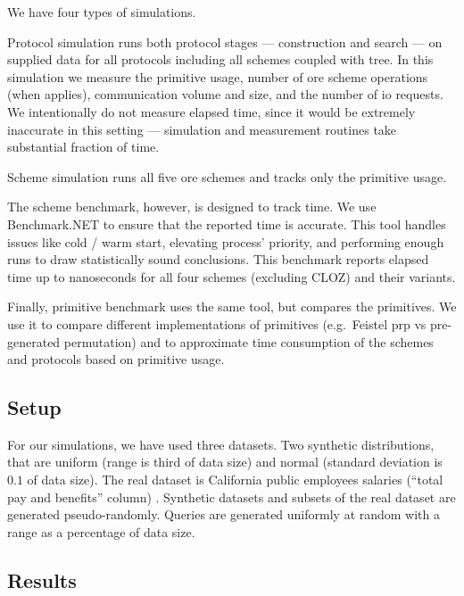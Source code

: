 			

			We have four types of simulations.

			Protocol simulation runs both protocol stages --- construction and search --- on supplied data for all protocols including all schemes coupled with {\BPlus} tree.
			In this simulation we measure the primitive usage, number of \acrshort{ore} scheme operations (when applies), communication volume and size, and the number of \acrshort{io} requests.
			We intentionally do not measure elapsed time, since it would be extremely inaccurate in this setting --- simulation and measurement routines take substantial fraction of time.

			Scheme simulation runs all five \acrshort{ore} schemes and tracks only the primitive usage.

			The scheme benchmark, however, is designed to track time.
			We use Benchmark.NET \cite{benchmark-net} to ensure that the reported time is accurate.
			This tool handles issues like cold / warm start, elevating process' priority, and performing enough runs to draw statistically sound conclusions.
			This benchmark reports elapsed time up to nanoseconds for all four schemes (excluding CLOZ) and their variants.

			Finally, primitive benchmark uses the same tool, but compares the primitives.
			We use it to compare different implementations of primitives (e.g.\ Feistel \acrshort{prp} vs pre-generated permutation) and to approximate time consumption of the schemes and protocols based on primitive usage.

	\subsection{Setup}

		For our simulations, we have used three datasets.
		Two synthetic distributions, that are uniform (range is third of data size) and normal (standard deviation is $0.1$ of data size).
		The real dataset is California public employees salaries (``total pay and benefits'' column) \cite{ca-dataset}.
		Synthetic datasets and subsets of the real dataset are generated pseudo\hyp{}randomly.
		Queries are generated uniformly at random with a range as a percentage of data size.

	\subsection{Results}

